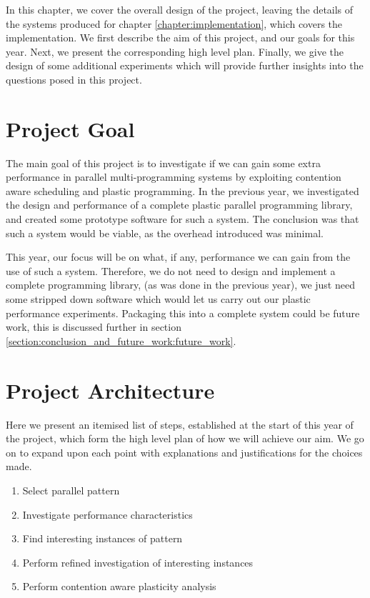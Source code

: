 
In this chapter, we cover the overall design of the project, leaving the details of the systems produced for chapter \ref{chapter:implementation}, which covers the implementation. We first describe the aim of this project, and our goals for this year. Next, we present the corresponding high level plan. Finally, we give the design of some additional experiments which will provide further insights into the questions posed in this project.



\section{Project Goal}
\label{section:design:project_goal}

The main goal of this project is to investigate if we can gain some extra performance in parallel multi-programming systems by exploiting contention aware scheduling and plastic programming. In the previous year, we investigated the design and performance of a complete plastic parallel programming library, and created some prototype software for such a system. The conclusion was that such a system would be viable, as the overhead introduced was minimal. 

This year, our focus will be on what, if any, performance we can gain from the use of such a system. Therefore, we do not need to design and implement a complete programming library, (as was done in the previous year), we just need some stripped down software which would let us carry out our plastic performance experiments. Packaging this into a complete system could be future work, this is discussed further in section \ref{section:conclusion_and_future_work:future_work}.



\section{Project Architecture}
\label{section:design:project_archetecture}

Here we present an itemised list of steps, established at the start of this year of the project, which form the high level plan of how we will achieve our aim. We go on to expand upon each point with explanations and justifications for the choices made.

\begin{enumerate}
    \item Select parallel pattern
    
    \item Investigate performance characteristics
    
    \item Find interesting instances of pattern
    
    \item Perform refined investigation of interesting instances
    
    \item Perform contention aware plasticity analysis
\end{enumerate}



